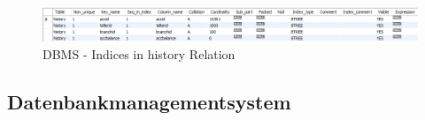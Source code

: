 \begin{figure}[h!]
    \center
    \includegraphics[width=\linewidth]{assets/img/database-history-indices}
    \caption{DBMS - Indices in history Relation}
    \label{fig:database-indices-history}
\end{figure}
\begin{center}

\end{center}
\subsection{Datenbankmanagementsystem}\label{subsec:datenbankmanagementsystem}